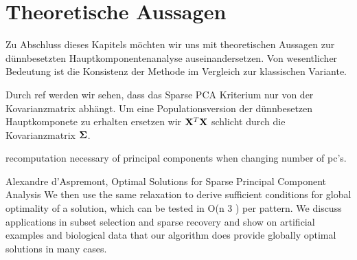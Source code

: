 \section{Theoretische Aussagen} 
\label{spca_theorems}


Zu Abschluss dieses Kapitels möchten wir uns mit theoretischen Aussagen zur dünnbesetzten Hauptkomponentenanalyse auseinandersetzen.  Von wesentlicher Bedeutung ist die Konsistenz der Methode im Vergleich zur klassischen Variante.

Durch ref werden wir sehen, dass das Sparse PCA Kriterium nur von der Kovarianzmatrix abhängt. Um eine Populationsversion der dünnbesetzen Hauptkomponete zu erhalten ersetzen wir $\mathbf{X}^T \mathbf{X}$ schlicht durch die Kovarianzmatrix $\mathbf{\Sigma}$.





recomputation necessary of principal components when changing number of pc's.

Alexandre d’Aspremont, Optimal Solutions for Sparse Principal Component Analysis
We then use the same relaxation to derive sufficient conditions for global optimality of a
solution, which can be tested in O(n
3
) per pattern. We discuss applications in subset selection and
sparse recovery and show on artificial examples and biological data that our algorithm does provide
globally optimal solutions in many cases.